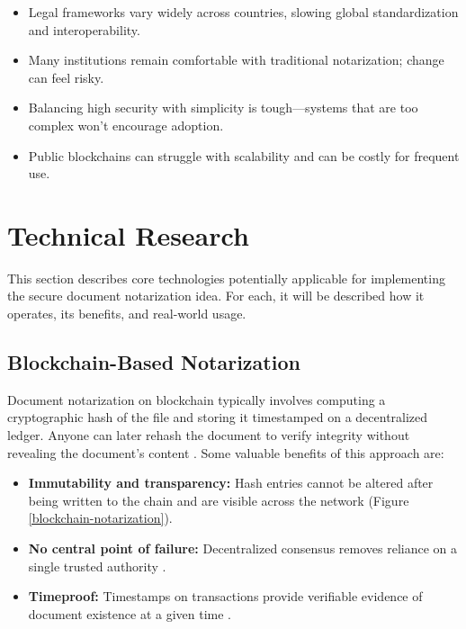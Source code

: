 \begin{itemize}[leftmargin=1.5em]
    \item Legal frameworks vary widely across countries, slowing global standardization and interoperability.
    \item Many institutions remain comfortable with traditional notarization; change can feel risky.
    \item Balancing high security with simplicity is tough—systems that are too complex won’t encourage adoption.
    \item Public blockchains can struggle with scalability and can be costly for frequent use.
\end{itemize}


\section{Technical Research}
This section describes core technologies potentially applicable for implementing the secure document notarization idea. For each, it will be described how it operates, its benefits, and real-world usage.

\subsection{Blockchain-Based Notarization}
Document notarization on blockchain typically involves computing a cryptographic hash of the file and storing it timestamped on a decentralized ledger. Anyone can later rehash the document to verify integrity without revealing the document’s content \cite{doxychain_power_nodate}. Some valuable benefits of this approach are:

\begin{itemize}
    \item \textbf{Immutability and transparency:} Hash entries cannot be altered after being written to the chain and are visible across the network (Figure \ref{blockchain-notarization}).
    \item \textbf{No central point of failure:} Decentralized consensus removes reliance on a single trusted authority \cite{deeksha_uikey_blockchain-based_nodate}.
    \item \textbf{Timeproof:} Timestamps on transactions provide verifiable evidence of document existence at a given time \cite{doxychain_power_nodate}.
\end{itemize}

